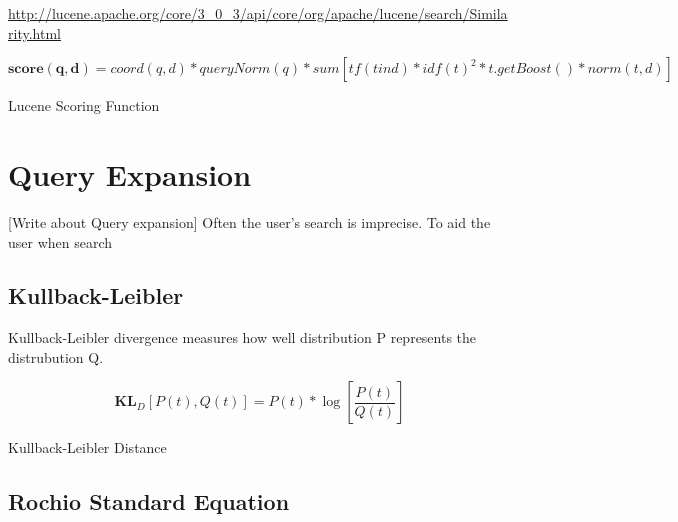 \url{http://lucene.apache.org/core/3_0_3/api/core/org/apache/lucene/search/Similarity.html}
\begin{cequation}[H]
	\begin{equation}
		\mathbf{score(q,d)} = coord(q,d) * queryNorm(q) * sum [tf(t in d) * idf(t)^2 * t.getBoost() * norm(t,d)]
	\end{equation}
	\caption{Lucene Scoring Function}
  \label{eq:scoring-function}
\end{cequation}

\section{Query Expansion}
[Write about Query expansion]
Often the user's search is imprecise.
To aid the user when search

\subsection{Kullback-Leibler}
Kullback-Leibler divergence measures how well distribution P represents the distrubution Q.

\begin{cequation}[H]
	\begin{equation}
	    \label{equ:line}
		\mathbf{KL}_D[P(t), Q(t)] = P(t)*\log{[\frac{P(t)}{Q(t)}]}
	\end{equation}
	\caption{Kullback-Leibler Distance}
  \label{kl-distance}
\end{cequation}

\subsection{Rochio Standard Equation}
